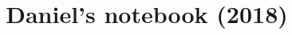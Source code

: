 \documentclass[pt]{extarticle}
\title{\vspace{-4ex}\Large{Daniel's notebook (2018)}}
\author{}
\date{}
\begin{document}
\begin{landscape}
\begin{multicols}{2}

\maketitle
\vspace{-13ex}
\tableofcontents
\pagestyle{fancy}



\end{multicols}
\end{landscape}
\end{document}

